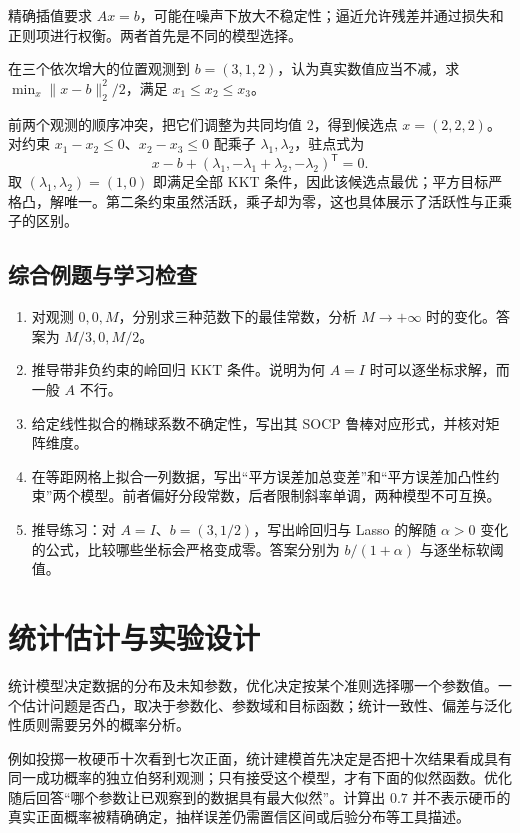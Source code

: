 \documentclass[UTF8,12pt,a4paper,fontset=fandol]{ctexbook}
\begin{document}
精确插值要求 $Ax=b$，可能在噪声下放大不稳定性；逼近允许残差并通过损失和正则项进行权衡。两者首先是不同的模型选择。

\begin{example}[由单调性约束修正一组观测]
在三个依次增大的位置观测到 $b=(3,1,2)$，认为真实数值应当不减，求 $\min_x\|x-b\|_2^2/2$，满足 $x_1\leq x_2\leq x_3$。
\end{example}
\begin{solve}
前两个观测的顺序冲突，把它们调整为共同均值 $2$，得到候选点 $x=(2,2,2)$。对约束 $x_1-x_2\leq0$、$x_2-x_3\leq0$ 配乘子 $\lambda_1,\lambda_2$，驻点式为
\[
 x-b+(\lambda_1,-\lambda_1+\lambda_2,-\lambda_2)^{\mathsf T}=0.
\]
取 $(\lambda_1,\lambda_2)=(1,0)$ 即满足全部 KKT 条件，因此该候选点最优；平方目标严格凸，解唯一。第二条约束虽然活跃，乘子却为零，这也具体展示了活跃性与正乘子的区别。
\end{solve}

\section{综合例题与学习检查}
\begin{enumerate}
 \item 对观测 $0,0,M$，分别求三种范数下的最佳常数，分析 $M\to+\infty$ 时的变化。答案为 $M/3,0,M/2$。
 \item 推导带非负约束的岭回归 KKT 条件。说明为何 $A=I$ 时可以逐坐标求解，而一般 $A$ 不行。
 \item 给定线性拟合的椭球系数不确定性，写出其 SOCP 鲁棒对应形式，并核对矩阵维度。
 \item 在等距网格上拟合一列数据，写出“平方误差加总变差”和“平方误差加凸性约束”两个模型。前者偏好分段常数，后者限制斜率单调，两种模型不可互换。
 \item 推导练习：对 $A=I$、$b=(3,1/2)$，写出岭回归与 Lasso 的解随 $\alpha>0$ 变化的公式，比较哪些坐标会严格变成零。答案分别为 $b/(1+\alpha)$ 与逐坐标软阈值。
\end{enumerate}

\chapter{统计估计与实验设计}
\label{ch:co-statistics}

统计模型决定数据的分布及未知参数，优化决定按某个准则选择哪一个参数值。一个估计问题是否凸，取决于参数化、参数域和目标函数；统计一致性、偏差与泛化性质则需要另外的概率分析。

例如投掷一枚硬币十次看到七次正面，统计建模首先决定是否把十次结果看成具有同一成功概率的独立伯努利观测；只有接受这个模型，才有下面的似然函数。优化随后回答“哪个参数让已观察到的数据具有最大似然”。计算出 $0.7$ 并不表示硬币的真实正面概率被精确确定，抽样误差仍需置信区间或后验分布等工具描述。
\end{document}
